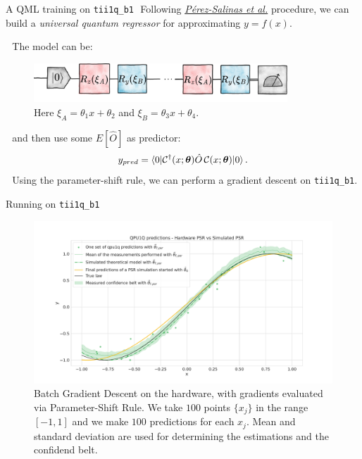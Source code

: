 \documentclass[8pt, xcolor={svgnames}, hyperref={colorlinks, linkcolor=black, citecolor=amethyst, urlcolor=amethyst}]{beamer}
\begin{document}
\begin{frame}{A QML training on \texttt{tii1q\_b1}}
\faArrowCircleRight\,\,Following \href{https://arxiv.org/abs/1907.02085}{\textit{Pérez-Salinas et al.}} 
procedure, we can build a \textit{universal quantum regressor}
for approximating $y=f(x)$. 
\pause 

\faArrowCircleRight\,\, The model can be:
\pause
    \begin{figure}  
    \includegraphics[width=0.85\textwidth]{figures/qpdf.png}
    \caption{Here $\xi_A= \theta_1x+\theta_2$ and $\xi_B = \theta_3x + \theta_4$.}
    \end{figure}
\pause
\faArrowCircleRight\,\, and then use some $E[\hat{O}]$ as predictor:
\begin{equation}
y_{pred} = \braket{0 | \mathcal{C}^{\dagger} (x; \bm{\theta}) \hat{O} \,
\mathcal{C} (x; \bm{\theta}) | 0}.
\end{equation}
\pause
\faArrowCircleRight\,\, Using the parameter-shift rule, we can perform a gradient descent on \texttt{tii1q\_b1}.
\end{frame}

\begin{frame}{Running on \texttt{tii1q\_b1}\hfill \faCogs}

    \begin{figure}  
    \includegraphics[width=1\textwidth]{figures/qpu1.pdf}
    \caption{Batch Gradient Descent on the hardware, with gradients evaluated 
    via Parameter-Shift Rule. We take $100$ points $\{x_j\}$ in the range $[-1,1]$ and we make 
    $100$ predictions for each $x_j$. Mean and standard deviation are used for 
    determining the estimations and the confidend belt.}
    \end{figure}

\end{frame}
\end{document}
